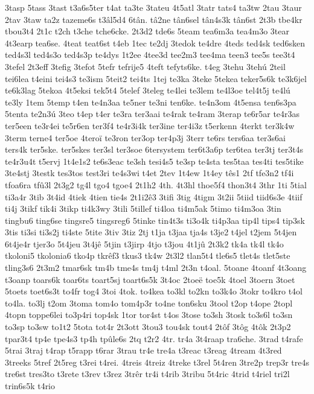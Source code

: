 {3tasp
5tass
3tast
t3a6s5ter
t4at
ta3te
3tateu
4t5atl
3tatr
tats4
ta3tw
2tau
3taur
2tav
3taw
ta2z
tazeme6s
t3âl5d4
6tân.
tâ2ne
tân6sel
tân4s3k
tân6st
2t3b
tbe4kr
tbou3t4
2t1c
t2ch
t3che
tche6cke.
2t3d2
tde6s
5team
tea6m3a
tea4m3o
3tear
4t3earp
tea6se.
4teat
teat6st
t4eb
1tec
te2dj
3tedok
te4dre
4teds
ted4sk
ted6sken
ted4s3l
ted4s3o
ted4s3p
te4dys
1t2ee
4tee3d
tee2m3
tee4ma
teen3
tee5s
tee3t4
3tefel
2t3eff
3tefig
3tefot
5tefr
tefrije5
4teft
tefyts6ke.
t4eg
3tehu
3tehú
2teil
tei6lea
t4eini
tei4s3
te3ism
5teit2
tei4ts
1tej
te3ka
3teke
5tekea
teker5s6k
te3k6jel
te6k3lag
5tekoa
4t5eksi
tek5t4
5telef
3teleg
te4lei
te3lem
te4l3oe
tel4t5j
te4lú
te3ly
1tem
5temp
t4en
te4n3aa
te5ner
te3ni
ten6ke.
te4n3om
4t5ensa
ten6s3pa
5tenta
te2n3ú
3teo
t4ep
t4er
te3ra
ter3aai
te4rak
te4ram
3terap
te6r5ar
te4r3as
ter5een
te3r4ei
te5r6en
ter3f4
te4r3i4k
ter3ine
ter4i3z
t5erkenn
4terkt
ter3k4w
3term
terne4
ter5oe
4teroï
te3ron
ter3op
ter4p3j
3terr
te6rs
ters6aa
ter3s6ai
ters4k
ter5ske.
ter5skes
ter3sl
ter3soe
6tersystem
ter6t3a6p
ter6tea
ter3tj
ter3t4s
te4r3u4t
t5ervj
1t4e1s2
te6s3eac
te3sh
tesi4s5
te3sp
te4sta
tes5taa
tes4ti
tes5tike
3te4stj
3testk
tes3tos
test3ri
te4s3wi
t4et
2tev
1t4ew
1t4ey
tês1
2tf
tfe3n2
tf4i
tfoa6ra
tfû3l
2t3g2
tg4l
tgo4
tgoe4
2t1h2
4th.
4t3hl
thoe5f4
thon3t4
3thr
1ti
5tial
ti3a4r
3tib
3t4id
4tiek
4tien
tie4s
2t1i2ê3
3tifi
3tig
4tigm
3t2ii
5tiid
tiid6s3e
4tiif
ti4j
3tikf
tik4i
3tikp
ti4k3wy
3tili
5tillef
ti4loa
ti4m5ak
5timo
ti4m3oa
3tin
tingbu6
ting6se
tingsre5
tingsreg6
5tinke
tin4t3s
ti3o4k
ti4p3aa
tip4l
tips4
tip3sk
3tis
ti3si
ti3s2j
ti4ste
5tite
3tiv
3tiz
2tj
t1ja
t3jaa
tja4s
t3je2
t4jel
t2jem
5t4jen
6t4je4r
tjer3o
5t4jeu
3t4jê
5tjin
t3jirp
4tjo
t3jou
4t1jû
2t3k2
tk4a
tk4l
tk4o
tkoloni5
tkolonia6
tko4p
tkrêf3
tkus3
tk4w
2t3l2
tlan5t4
tle6s5
tlet4s
tlet5ste
tling3s6
2t3m2
tmar6sk
tm4b
tme4s
tm4j
t4ml
2t3n
t4oal.
5toane
4toanf
4t3oang
t3oanp
toars6k
toar6ts
toart5sj
toart6s5k
3t4oc
2toeë
toe5k
4toel
3toern
3toet
5toets
toet6s3t
to4fr
tog4
3toi
4tok.
to4kea
to3kl
to2kn
to3k4o
3tokr
to4kro
t4ol
to4la.
to3lj
t2om
3toma
tom4o
tom4p3r
to4ne
ton6sku
3tool
t2op
t4ope
2topl
4topn
toppe6lei
to3p4ri
top4sk
1tor
tor4st
t4os
3tose
to3sh
3tosk
to3s6l
to3sn
to3sp
to3sw
to1t2
5tota
tot4r
2t3ott
3tou3
tou4sk
tout4
2tôf
3tôg
4tôk
2t3p2
tpar3t4
tp4e
tpe4s3
tp4h
tpûle6s
2tq
t2r2
4tr.
tr4a
3t4raap
tra6che.
3trad
t4rafe
5trai
3traj
t4rap
t5rapp
t6rar
3trau
tr4e
tre4a
t3reac
t3reag
4tream
4t3red
3treeks
5tref
2t5reg
t3rei
t4rei.
4treis
4treiz
4treke
t3rel
5t4ren
3tre2p
trep3r
tre4s
tre6st
tres3to
t3rete
t3rev
t3rez
3trêr
tr4i
t4rib
3tribu
5t4ric
4trid
t4riel
tri2l
trin6s5k
t4rio
}
